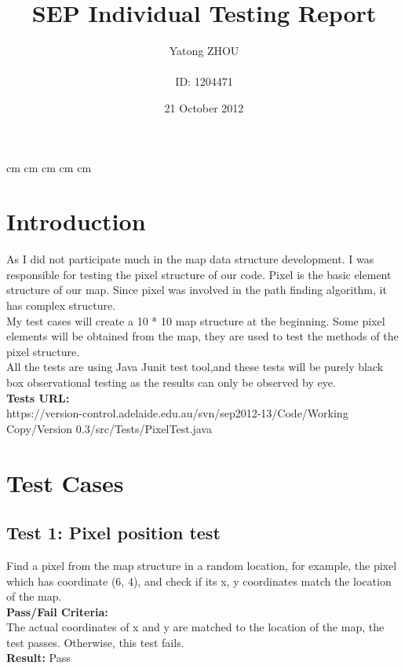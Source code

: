 \documentclass[11pt, a4paper]{report}
\begin{document}
\title{\Huge SEP Individual Testing Report }
\author{Yatong ZHOU\\ \\ID: 1204471}
\date{21 October 2012}
\maketitle
\pagebreak
{} cm
 cm
 cm
 cm
 cm


\section{Introduction}
As I did not participate much in the map data structure development. I was responsible for testing the pixel structure of our code. Pixel is the basic element structure of our map. Since pixel was involved in the path finding algorithm, it has complex structure. \\

\noindent My test cases will create a 10 * 10 map structure at the beginning. Some pixel elements will be obtained from the map, they are used to test the methods of the pixel structure. \\

\noindent All the tests are using Java Junit test tool,and these tests will be purely black box observational testing as the results can only be observed by eye.\\

\noindent\textbf{Tests URL: }\\
https://version-control.adelaide.edu.au/svn/sep2012-13/Code/Working Copy/Version 0.3/src/Tests/PixelTest.java

\pagebreak
\section{Test Cases}

\subsection {Test 1: Pixel position test}
Find a pixel from the map structure in a random location, for example, the pixel which has coordinate (6, 4), and check if its x, y coordinates match the location of the map.\\
\noindent\textbf{Pass/Fail Criteria:\\}
The actual coordinates of x and y are matched to the location of the map, the test passes. Otherwise, this test fails.\\
\noindent\textbf{Result: }Pass
\end{document}
